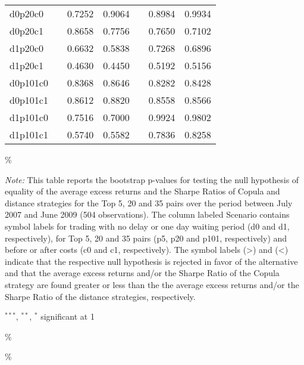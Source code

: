 \documentclass[a4paper]{article}
\begin{document}
\begin{threeparttable}[H]
\begin{tabularx}{\textwidth}{@{\extracolsep{\fill}}lllllll@{}}
		d0p20c0 & & 0.7252 & 0.9064 &       & 0.8984 & 0.9934 \\
		d0p20c1 & & 0.8658 & 0.7756 &       & 0.7650 & 0.7102 \\
		d1p20c0 & & 0.6632 & 0.5838 &       & 0.7268 & 0.6896 \\
		d1p20c1 & & 0.4630 & 0.4450 &       & 0.5192 & 0.5156 \\
		d0p101c0 & & 0.8368 & 0.8646 &       & 0.8282 & 0.8428 \\
		d0p101c1 & & 0.8612 & 0.8820 &       & 0.8558 & 0.8566 \\
		d1p101c0 & & 0.7516 & 0.7000 &       & 0.9924 & 0.9802 \\
		d1p101c1 & & 0.5740 & 0.5582 &       & 0.7836 & 0.8258 \\
		\bottomrule
	\end{tabularx}\%
	\begin{tablenotes}
		\item \textit{Note:} \scriptsize This table reports the bootstrap p-values for testing the null hypothesis of equality of the average excess returns and the Sharpe Ratios of Copula and distance strategies for the Top 5, 20 and 35 pairs over the period between July 2007 and June 2009 (504 observations). The column labeled Scenario contains symbol labels for trading with no delay or one day waiting period (d0 and d1, respectively), for Top 5, 20 and 35 pairs (p5, p20 and p101, respectively) and before or after costs (c0 and c1, respectively). The symbol labels (>) and (<) indicate that the respective null hypothesis is rejected in favor of the alternative and that the average excess returns and/or the Sharpe Ratio of the Copula strategy are found greater or less than the the average excess returns and/or the Sharpe Ratio of the distance strategies, respectively.
		\item \scriptsize $^{\ast\ast\ast}$, $^{\ast\ast}$, $^{\ast}$  significant at 1\\%
	\end{tablenotes}
	\label{tab:table124}\%
\end{threeparttable}\%

\medskip
\end{document}
